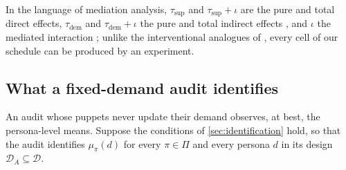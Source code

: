 In the language of mediation analysis, $\tau_{\mathrm{sup}}$ and $\tau_{\mathrm{sup}}+\iota$ are the pure and total direct effects, $\tau_{\mathrm{dem}}$ and $\tau_{\mathrm{dem}}+\iota$ the pure and total indirect effects \citep{robins1992,pearl2001}, and $\iota$ the mediated interaction \citep{vanderweele2014}; unlike the interventional analogues of \citet{vanderweele2014b}, every cell of our schedule can be produced by an experiment.

\subsection{What a fixed-demand audit identifies}\label{sec:est-audit}

An audit whose puppets never update their demand observes, at best, the persona-level means. Suppose the conditions of \cref{sec:identification} hold, so that the audit identifies $\mu_\pi(d)$ for every $\pi\in\Pi$ and every persona $d$ in its design $\mathcal D_A\subseteq\mathcal D$.

